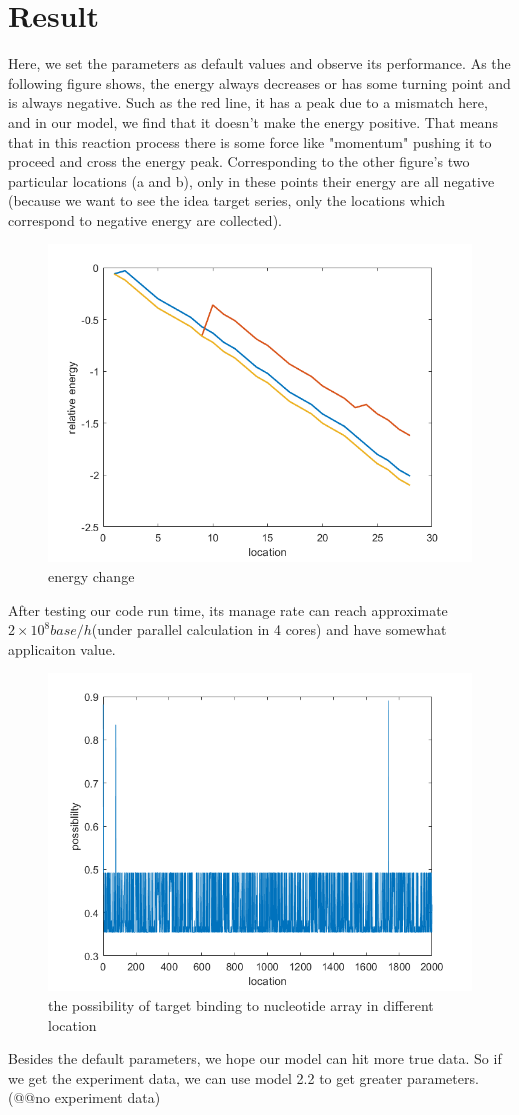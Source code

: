 \section{Result}
Here, we set the parameters as default values and observe its performance. As the following figure shows, the energy always decreases or has some turning point and is always negative. Such as the red line, it has a peak due to a mismatch here, and in our model, we find that it doesn't make the energy positive. That means that in this reaction process there is some force like "momentum" pushing it to proceed and cross the energy peak. Corresponding to the other figure's two particular locations (a and b), only in these points their energy are all negative (because we want to see the idea target series, only the locations which correspond to negative energy are collected).
\begin{figure}[h]
\centering
\includegraphics[width=0.7\linewidth]{energy_change}
\caption{energy change}
\label{fig:energychange}
\end{figure}
After testing our code run time, its manage rate can reach approximate $2\times10^8 base/h$(under parallel calculation in 4 cores) and have somewhat applicaiton value. 
\begin{figure}[h]
\centering
\includegraphics[width=0.7\linewidth]{fig1}
\caption{the possibility of target binding to nucleotide array in different location}
\label{fig:fig1}
\end{figure}
Besides the default parameters, we hope our model can hit more true data. So if we get the experiment data, we can use model 2.2 to get greater parameters. (@@no experiment data) 
